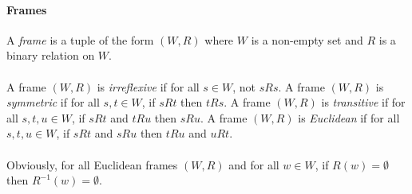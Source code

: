 \documentclass[draft]{article}
\newtheorem{lemma}{Lemma}
\begin{document}
\paragraph{Frames}
%
%
A {\it frame}\/ is a tuple of the form $(W,R)$ where $W$ is a non-empty set and $R$ is a binary relation on $W$.
%
%
\\
\\
%
%
A frame $(W,R)$ is {\it irreflexive}\/ if for all $s{\in}W$, not $s{R}s$.
A frame $(W,R)$ is {\it symmetric}\/ if for all $s,t{\in}W$, if $s{R}t$ then $t{R}s$.
A frame $(W,R)$ is {\it transitive}\/ if for all $s,t,u{\in}W$, if $s{R}t$ and $t{R}u$ then $s{R}u$.
A frame $(W,R)$ is {\it Euclidean}\/ if for all $s,t,u{\in}W$, if $s{R}t$ and $s{R}u$ then $t{R}u$ and $u{R}t$.
%
%
%
%
\\
\\
Obviously, for all Euclidean frames $(W,R)$ and for all $w{\in}W$, if $R(w){=}\emptyset$ then $R^{{-}1}(w){=}\emptyset$.
%
%
%
%
%
%
\end{document}
